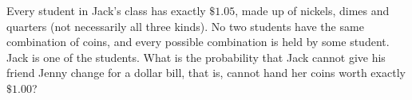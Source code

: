 Every student in Jack's class has exactly $\$1.05$, made up of nickels, dimes and quarters (not necessarily all three kinds). No two students have the same combination of coins, and every possible combination is held by some student. Jack is one of the students. What is the probability that Jack cannot give his friend Jenny change for a dollar bill, that is, cannot hand her coins worth exactly $\$1.00$?
